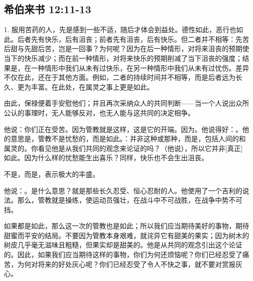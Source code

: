 
\subsection{希伯来书 12:11-13}

\par

1. 服用苦药的人，先是感到一些不适，随后才体会到益处。德性如此，恶行也如此。后者先有快乐，后有沮丧；前者先有沮丧，后有快乐。但二者并不相等：先苦后甜与先甜后苦，岂是一回事？为何呢？因为在后一种情形，对将来沮丧的预期使当下的快乐减少；而在前一种情形，对将来快乐的预期削减了当下沮丧的强度；结果是，在一种情形中我们从未有过快乐，在另一种情形中我们从未有过忧伤。差异不仅在此，还在于其他方面。例如，二者的持续时间并不相等，而是后者远为长久、更为丰富。在此处，在属灵之事上更是如此。\par

由此，保禄便着手安慰他们；并且再次采纳众人的共同判断——当一个人说出众所公认的事理时，无人能够反对，也无人能与这共同的决定相争。\par

他说：你们正在受苦。因为管教就是这样，这是它的开端。因为。他说得好：。他的意思是，管教不是忧愁的，而是如此。：并非这种或那种，而是，包括人间的和属灵的。你看见他是从我们共同的观念来论证的吗？（他说），所以它并非[真正]如此。因为什么样的忧愁能生出喜乐？同样，快乐也不会生出沮丧。\par

不是，而是，表示极大的丰盛。\par

他说：。是什么意思？就是那些长久忍受、恒心忍耐的人。他使用了一个吉利的说法。那么，管教就是操练，使运动员强壮，在战斗中不可战胜，在战争中势不可挡。\par

如果都是如此，那么这一次的管教也是如此；所以我们应当期待美好的事物，期待甜蜜而平安的结局。不要因为管教本身艰难，就诧异它有甜美的果实；因为树木的树皮几乎毫无滋味且粗糙，但果实却是甜美的。他是从共同的观念引出这个论证的。因此，如果我们应当期待这样的事物，你们为何还烦恼呢？你们已经忍受了痛苦，为何对将来的好处灰心呢？你们已经忍受了令人不快之事，就不要对赏报灰心。\par

